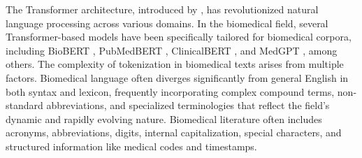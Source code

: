 \documentclass[11pt]{article}
\begin{document}
 The Transformer architecture, introduced by \citet{vaswani2017attention}, has revolutionized natural language processing across various domains. In the biomedical field, several Transformer-based models have been specifically tailored for biomedical corpora, including BioBERT \cite{lee2020biobert}, PubMedBERT \cite{gu2021domain}, ClinicalBERT \cite{Huang2019ClinicalBERT}, and MedGPT \cite{Zuo2019MedGPT}, among others. The complexity of tokenization in biomedical texts arises from multiple factors. Biomedical language often diverges significantly from general English in both syntax and lexicon, frequently incorporating complex compound terms, non-standard abbreviations, and specialized terminologies that reflect the field's dynamic and rapidly evolving nature. Biomedical literature often includes acronyms, abbreviations, digits, internal capitalization, special characters, and structured information like medical codes and timestamps.


\end{document}
